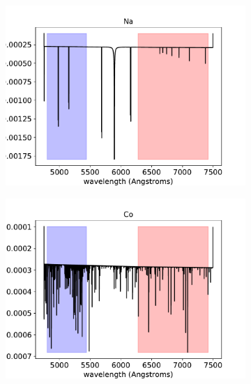 \documentclass[twocolumn]{aastex631}
\begin{document}
\begin{figure}[ht!]
\begin{subfigure}[b]{0.3\textwidth}
                \label{fig:Fe+-spectrum}
            \end{subfigure}
            \begin{subfigure}[b]{0.3\textwidth}
                \centering
                \includegraphics[width=\textwidth]{plots/spectra/spectrum.KELT-20b.Na.2.94e-06.inverted-transmission-better.pdf}
                \label{fig:Na-spectrum}
            \end{subfigure}
            \begin{subfigure}[b]{0.3\textwidth}
                \centering
                \includegraphics[width=\textwidth]{plots/spectra/spectrum.KELT-20b.Co.1.67e-07.inverted-transmission-better.pdf}
                \label{fig:Co-spectrum}

\end{subfigure}
\end{figure}
\end{document}
